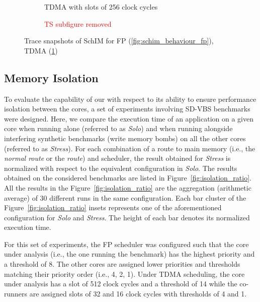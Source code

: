 \begin{figure}[t]
\begin{subfigure}{0.45\textwidth}
        \caption{TDMA with slots of 256 clock cycles}
        \label{fig:schim_behaviour_tdma}
      \end{subfigure}
      \hfill
      \begin{subfigure}{0.45\textwidth}
        \textcolor{red}{TS subfigure removed}
      \end{subfigure}
      \caption{Trace snapshots of SchIM for FP (\ref{fig:schim_behaviour_fp}), TDMA (\ref{fig:schim_behaviour_tdma}) }
      \label{fig:schim_behaviour}
    \end{figure}

\subsection{Memory Isolation}
\label{subsec:isolation}
To evaluate the capability of our \schim with respect to its ability to
ensure performance isolation between the cores, a set of experiments
involving SD-VBS benchmarks were designed. Here, we compare the
execution time of an application on a given core when running alone
(referred to as \emph{Solo}) and when running alongside interfering synthetic
benchmarks (write memory bombs) on all the other cores (referred to as
\emph{Stress}).
For each combination of a route to main memory (i.e., the \emph{normal
route} or the \emph{\schim route}) and scheduler, the result obtained
for \emph{Stress} is normalized with respect to the equivalent configuration
in \emph{Solo}.
The results obtained on the considered benchmarks are listed in
Figure~\ref{fig:isolation_ratio}. All the results in the
Figure~\ref{fig:isolation_ratio} are the aggregation (arithmetic average)
of 30 different runs in the same configuration. Each bar cluster of the Figure~\ref{fig:isolation_ratio} insets represents one of the aforementioned configuration for \emph{Solo} and \emph{Stress}. The height of each bar denotes its normalized execution time.

For this set of experiments, the FP scheduler was configured such that the core under
analysis (i.e., the one running the benchmark) has the highest priority
and a threshold of 8. The other cores are assigned lower priorities and
thresholds matching their priority order (i.e., 4, 2, 1). Under TDMA scheduling, the core under analysis has a slot of 512 clock cycles and a threshold of 14 while the co-runners are assigned slots of 32 and 16 clock cycles with thresholds of 4 and 1.


